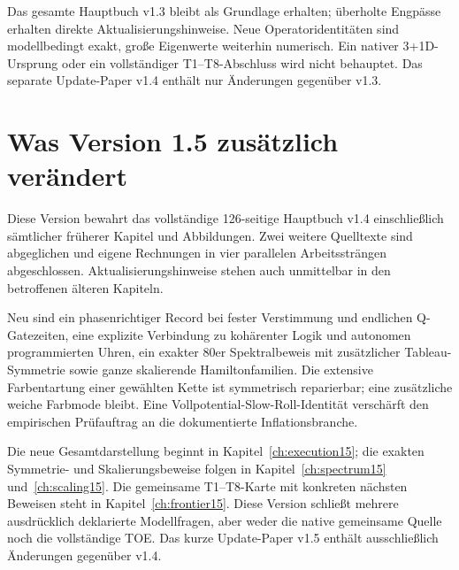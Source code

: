 \documentclass[11pt,a4paper,oneside,parskip=half,headings=normal]{scrreprt}
\begin{document}
Das gesamte Hauptbuch v1.3 bleibt als Grundlage erhalten; überholte Engpässe erhalten direkte Aktualisierungshinweise. Neue Operatoridentitäten sind modellbedingt exakt, große Eigenwerte weiterhin numerisch. Ein nativer 3+1D-Ursprung oder ein vollständiger T1--T8-Abschluss wird nicht behauptet. Das separate Update-Paper v1.4 enthält nur Änderungen gegenüber v1.3.

\section*{Was Version 1.5 zusätzlich verändert}
Diese Version bewahrt das vollständige 126-seitige Hauptbuch v1.4 einschließlich sämtlicher früherer Kapitel und Abbildungen. Zwei weitere Quelltexte sind abgeglichen und eigene Rechnungen in vier parallelen Arbeitssträngen abgeschlossen. Aktualisierungshinweise stehen auch unmittelbar in den betroffenen älteren Kapiteln.

Neu sind ein phasenrichtiger Record bei fester Verstimmung und endlichen Q-Gatezeiten, eine explizite Verbindung zu kohärenter Logik und autonomen programmierten Uhren, ein exakter 80er Spektralbeweis mit zusätzlicher Tableau-Symmetrie sowie ganze skalierende Hamiltonfamilien. Die extensive Farbentartung einer gewählten Kette ist symmetrisch reparierbar; eine zusätzliche weiche Farbmode bleibt. Eine Vollpotential-Slow-Roll-Identität verschärft den empirischen Prüfauftrag an die dokumentierte Inflationsbranche.

Die neue Gesamtdarstellung beginnt in Kapitel~\ref{ch:execution15}; die exakten Symmetrie- und Skalierungsbeweise folgen in Kapitel~\ref{ch:spectrum15} und~\ref{ch:scaling15}. Die gemeinsame T1--T8-Karte mit konkreten nächsten Beweisen steht in Kapitel~\ref{ch:frontier15}. Diese Version schließt mehrere ausdrücklich deklarierte Modellfragen, aber weder die native gemeinsame Quelle noch die vollständige TOE. Das kurze Update-Paper v1.5 enthält ausschließlich Änderungen gegenüber v1.4.
\end{document}
